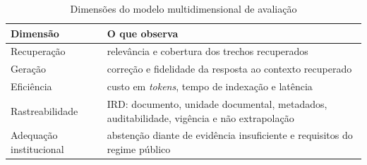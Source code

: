 \begin{table}[htb]
  \caption{Dimensões do modelo multidimensional de avaliação}
  \label{tab:dimensoes}
  \centering
  \begin{tabular}{p{4.2cm}p{10.4cm}}
    \hline
    \textbf{Dimensão} & \textbf{O que observa} \\
    \hline
    Recuperação & relevância e cobertura dos trechos recuperados \\
    Geração & correção e fidelidade da resposta ao contexto recuperado \\
    Eficiência & custo em \textit{tokens}, tempo de indexação e latência \\
    Rastreabilidade & IRD: documento, unidade documental, metadados,
      auditabilidade, vigência e não extrapolação \\
    Adequação institucional & abstenção diante de evidência insuficiente e
      requisitos do regime público \\
    \hline
  \end{tabular}
\end{table}
